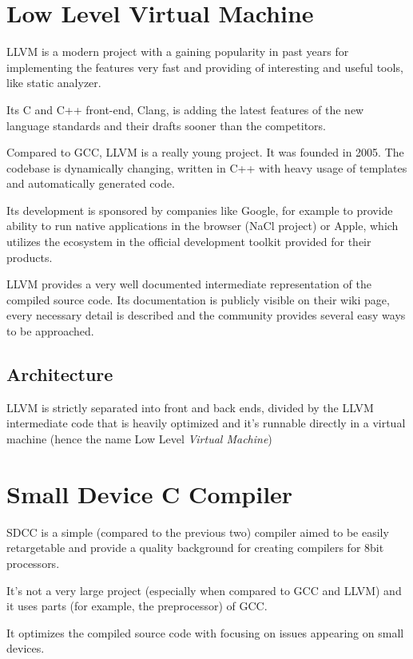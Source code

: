     \section{Low Level Virtual Machine}

    LLVM is a modern project with a gaining popularity in past years for implementing the features very fast and providing of interesting and useful tools, like static analyzer.

    Its C and C++ front-end, Clang, is adding the latest features of the new language standards and their drafts sooner than the competitors.

    Compared to GCC, LLVM is a really young project. It was founded in 2005. The codebase is dynamically changing, written in C++ with heavy usage of templates and automatically generated code.

    Its development is sponsored by companies like Google, for example to provide ability to run native applications in the browser (NaCl project) or Apple, which utilizes the ecosystem in the official development toolkit provided for their products.

    LLVM provides a very well documented intermediate representation of the compiled source code. Its documentation is publicly visible on their wiki page, every necessary detail is described and the community provides several easy ways to be approached.

        \subsection{Architecture}

        LLVM is strictly separated into front and back ends, divided by the LLVM intermediate code that is heavily optimized and it's runnable directly in a virtual machine (hence the name Low Level \emph{Virtual Machine})

    \section{Small Device C Compiler}

    SDCC is a simple (compared to the previous two) compiler aimed to be easily retargetable and provide a quality background for creating compilers for 8bit processors.

    It's not a very large project (especially when compared to GCC and LLVM) and it uses parts (for example, the preprocessor) of GCC.

    It optimizes the compiled source code with focusing on issues appearing on small devices.

